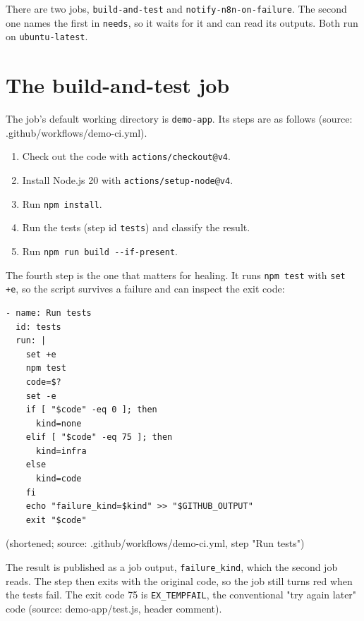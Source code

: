 

There are two jobs, \texttt{build-\allowbreak{}and-\allowbreak{}test} and \texttt{notify-\allowbreak{}n8n-\allowbreak{}on-\allowbreak{}failure}. The second one names the first in \texttt{needs}, so it waits for it and can read its outputs. Both run on \texttt{ubuntu-\allowbreak{}latest}.

\section{The build-and-test job}

The job's default working directory is \texttt{demo-\allowbreak{}app}. Its steps are as follows (source: .github/\allowbreak{}workflows/\allowbreak{}demo-ci.yml).

\begin{enumerate}[leftmargin=*, itemsep=2pt]
\item Check out the code with \texttt{actions/\allowbreak{}checkout@v4}.
\item Install Node.js 20 with \texttt{actions/\allowbreak{}setup-\allowbreak{}node@v4}.
\item Run \texttt{npm install}.
\item Run the tests (step id \texttt{tests}) and classify the result.
\item Run \texttt{npm run build -\allowbreak{}-\allowbreak{}if-\allowbreak{}present}.
\end{enumerate}

The fourth step is the one that matters for healing. It runs \texttt{npm test} with \texttt{set +e}, so the script survives a failure and can inspect the exit code:

\begin{lstlisting}
- name: Run tests
  id: tests
  run: |
    set +e
    npm test
    code=$?
    set -e
    if [ "$code" -eq 0 ]; then
      kind=none
    elif [ "$code" -eq 75 ]; then
      kind=infra
    else
      kind=code
    fi
    echo "failure_kind=$kind" >> "$GITHUB_OUTPUT"
    exit "$code"
\end{lstlisting}

(shortened; source: .github/\allowbreak{}workflows/\allowbreak{}demo-ci.yml, step "Run tests")

The result is published as a job output, \texttt{failure\_\allowbreak{}kind}, which the second job reads. The step then exits with the original code, so the job still turns red when the tests fail. The exit code 75 is \texttt{EX\_\allowbreak{}TEMPFAIL}, the conventional "try again later" code (source: demo-app/\allowbreak{}test.js, header comment).

